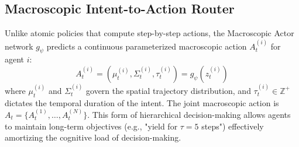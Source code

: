 \documentclass[conference]{IEEEtran}
\begin{document}
\subsection{Macroscopic Intent-to-Action Router}
Unlike atomic policies that compute step-by-step actions, the Macroscopic Actor network $g_\psi$ predicts a continuous parameterized macroscopic action $A_t^{(i)}$ for agent $i$:
\begin{equation}
A_t^{(i)} = (\mu_t^{(i)}, \Sigma_t^{(i)}, \tau_t^{(i)}) = g_\psi(z_t^{(i)})
\end{equation}
where $\mu_t^{(i)}$ and $\Sigma_t^{(i)}$ govern the spatial trajectory distribution, and $\tau_t^{(i)} \in \mathbb{Z}^+$ dictates the temporal duration of the intent. The joint macroscopic action is $A_t = \{A_t^{(1)}, \dots, A_t^{(N)}\}$. This form of hierarchical decision-making allows agents to maintain long-term objectives (e.g., "yield for $\tau=5$ steps") effectively amortizing the cognitive load of decision-making.
\end{document}
